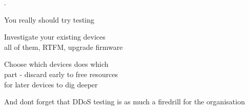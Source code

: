 \documentclass[Screen16to9,17pt]{foils}
\begin{document}

.
\begin{list1}
\item You really should try testing
\item Investigate your existing devices\\
all of them, RTFM, upgrade firmware
\item Choose which devices does which\\
part - discard early to free resources\\
for later devices to dig deeper
\end{list1}

\vskip 3cm
\centerline{And dont forget that DDoS testing is as much a firedrill for the organisation}


\slidenext
\end{document}
